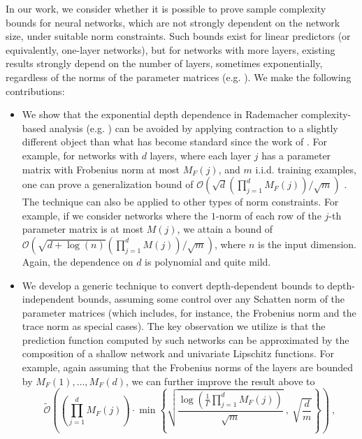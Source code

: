 \documentclass[final,12pt]{colt2018} %
\newcommand{\Ocal}{\mathcal{O}}
\begin{document}
In our work, we consider whether it is possible to prove sample 
complexity bounds for neural networks, which are not strongly dependent on the 
network size, under suitable norm constraints. Such bounds exist for linear 
predictors (or equivalently, one-layer networks), but for networks with more 
layers, existing results strongly depend on the number of layers, sometimes 
exponentially, regardless of the norms of the parameter matrices 
(e.g. 
\citet{anthony2009neural,neyshabur2015norm,bartlett2017spectrally,neyshabur2017pac}).
We make the following contributions:
\begin{itemize}[leftmargin=*]
	\item We show that the exponential depth 
	dependence in Rademacher complexity-based analysis (e.g. 
	\citet{neyshabur2015norm}) can be avoided by applying contraction to a 
	slightly different object than what has become standard since the work 
	of 
	\cite{bartlett2002rademacher}. For 
	example, for networks with $d$ layers, where each layer $j$ has a parameter 
	matrix with Frobenius norm at most 
	$M_F(j)$, and $m$ i.i.d. training examples, one can prove a generalization 
	bound of $\Ocal\left(\sqrt{d}\left(\prod_{j=1}^d 
	M_F(j)\right)/\sqrt{m}\right)$ . 
	The technique can also be applied to other types of norm constraints. 
	For example, if we consider networks where the $1$-norm of each row of the 
	$j$-th parameter matrix is at most $M(j)$, we attain a bound of
	$
	\Ocal\left(\sqrt{d+\log(n)}\left(\prod_{j=1}^{d}M(j)\right)/\sqrt{m}\right)
	$,
	where $n$ is the input dimension. Again, the dependence on $d$ is 
	polynomial and quite mild. 
	\item We develop a generic technique to 
	convert depth-dependent bounds to depth-independent bounds, assuming some 
	control over any Schatten norm of the parameter matrices (which includes, 
	for instance, the Frobenius norm and the trace norm as special cases). The 
	key observation we utilize is that the prediction function computed by such 
	networks can be approximated by the composition of a 
	shallow network and univariate Lipschitz functions. For example, again 
	assuming that the Frobenius norms of the layers are bounded by 
	$M_F(1),\ldots,M_F(d)$, we can 
	further improve the result above to
	\begin{equation}\label{eq:frobb}
	\tilde{\Ocal}\left(\left(\prod_{j=1}^d 
	M_F(j)\right)\cdot\min\left\{\sqrt{\frac{\log\left(\frac{1}{\Gamma}
			\prod_{j=1}^{d}M_F(j)\right)}{\sqrt{m}}}~,~
	\sqrt{\frac{d}{m}}\right\}
	\right)~,
	\end{equation}

\end{itemize}
\end{document}
